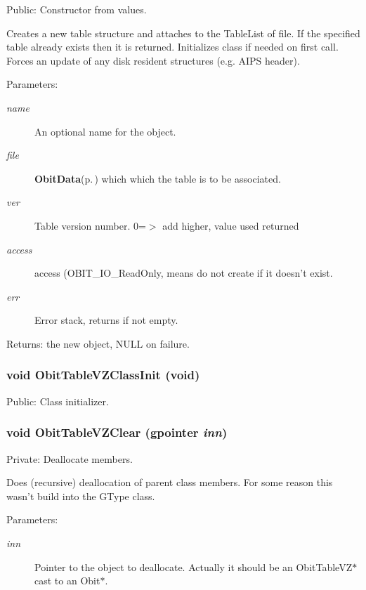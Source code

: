 Public: Constructor from values. 

Creates a new table structure and attaches to the Table\-List of file. If the specified table already exists then it is returned. Initializes class if needed on first call. Forces an update of any disk resident structures (e.g. AIPS header). \begin{Desc}
\item[Parameters:]
\begin{description}
\item[{\em name}]An optional name for the object. \item[{\em file}]{\bf Obit\-Data}{\rm (p.\,\pageref{structObitData})} which which the table is to be associated. \item[{\em ver}]Table version number. 0=$>$ add higher, value used returned \item[{\em access}]access (OBIT\_\-IO\_\-Read\-Only, means do not create if it doesn't exist. \item[{\em err}]Error stack, returns if not empty. \end{description}
\end{Desc}
\begin{Desc}
\item[Returns:]the new object, NULL on failure. \end{Desc}
\subsubsection{\setlength{\rightskip}{0pt plus 5cm}void Obit\-Table\-VZClass\-Init (void)}\label{ObitTableVZ_8c_a27}


Public: Class initializer. 

\subsubsection{\setlength{\rightskip}{0pt plus 5cm}void Obit\-Table\-VZClear (gpointer {\em inn})}\label{ObitTableVZ_8c_a9}


Private: Deallocate members. 

Does (recursive) deallocation of parent class members. For some reason this wasn't build into the GType class. \begin{Desc}
\item[Parameters:]
\begin{description}
\item[{\em inn}]Pointer to the object to deallocate. Actually it should be an Obit\-Table\-VZ$\ast$ cast to an Obit$\ast$. \end{description}
\end{Desc}
